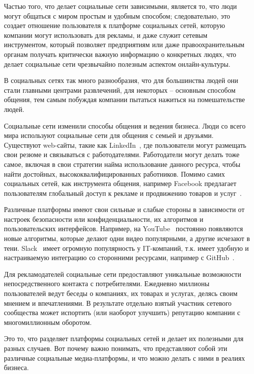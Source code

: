 Частью того, что делает социальные сети зависимыми, является то, что
люди могут общаться с миром простым и удобным способом; следовательно,
это создает отношение пользователя к платформе социальных сетей, которую
компании могут использовать для рекламы, и даже служит сетевым
инструментом, который позволяет предприятиям или даже
правоохранительным органам получать критически важную информацию о
конкретных людях, что делает социальные сети чрезвычайно полезным
аспектом онлайн-культуры.

В социальных сетях так много разнообразия, что для большинства
людей они стали главными центрами развлечений, для некоторых –
основным способом общения, тем самым побуждая компании пытаться
нажиться на помешательстве людей.

Социальные сети изменили способы общения и ведения бизнеса. Люди
со всего мира используют социальные сети для общения с семьей и
друзьями. Существуют web-сайты, такие как LinkedIn~\cite{linkedIn}, где пользователи
могут размещать свои резюме и связываться с работодателями. Работодатели
могут делать тоже самое, включая в свои стратегии найма использование
данного ресурса, чтобы найти достойных, высококвалифицированных
работников. Помимо самих социальных сетей, как инструмента общения,
например Facebook предлагает пользователям глобальный доступ к рекламе и
продвижению товаров и услуг~\cite{facebook}.

Различные платформы имеют свои сильные и слабые стороны в
зависимости от настроек безопасности или конфиденциальности, их
алгоритмов и пользовательских интерфейсов. Например, на YouTube~\cite{youtube}
постоянно появляются новые алгоритмы, которые делают одни видео
популярными, а другие исчезают в тени. Slack~\cite{slack} имеет огромную
популярность у IT-компаний, т.к. имеет удобную и настраиваемую
интеграцию со сторонними ресурсами, например с GitHub~\cite{gitHub}.

Для рекламодателей социальные сети предоставляют уникальные
возможности непосредственного контакта с потребителями. Ежедневно
миллионы пользователей ведут беседы о компаниях, их товарах и услугах,
делясь своим мнением и впечатлениями. В результате отдельно взятый
участник сетевого сообщества может испортить (или наоборот улучшить)
репутацию компании с многомиллионным оборотом.

Это то, что разделяет платформы социальных сетей и делает их
полезными для разных случаев. Вот почему важно понимать, что
представляют собой эти различные социальные медиа-платформы, и что
можно делать с ними в реалиях бизнеса. 

